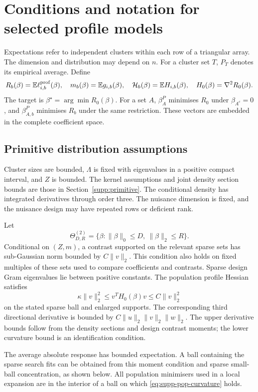\section{Conditions and notation for selected profile models}\label{supp:conditions}

Expectations refer to independent clusters within each row of a
triangular array. The dimension and distribution may depend on $n$.
For a cluster set $T$, $P_T$ denotes its empirical average. Define
\[
 R_b(\beta)=\mathbb{E}\ell_{i,b}^{\mathrm{prof}}(\beta),\quad
 m_b(\beta)=\mathbb{E} g_{i,b}(\beta),\quad
 \mathcal H_b(\beta)=\mathbb{E} H_{i,b}(\beta),\quad
 H_0(\beta)=\nabla^2R_0(\beta).
\]
The target is $\beta^\star=\arg\min R_0(\beta)$. For a set $A$,
$\beta_A^P$ minimises $R_0$ under $\beta_{A^c}=0$, and
$\beta_{A,b}^P$ minimises $R_b$ under the same restriction. These
vectors are embedded in the complete coefficient space.

\subsection{Primitive distribution assumptions}

Cluster sizes are bounded, $\Lambda$ is fixed with eigenvalues in a
positive compact interval, and $Z$ is bounded. The kernel assumptions
and joint density section bounds are those in
Section~\ref{supp:primitive}. The conditional density has integrated
derivatives through order three. The nuisance dimension is fixed, and
the nuisance design may have repeated rows or deficient rank.

Let
\[
 \Theta_{D,R}^{(2)}=\{\beta:\|\beta\|_0\leq D,\ \|\beta\|_2\leq R\}.
\]
Conditional on $(Z,m)$, a contrast supported on the relevant sparse
sets has sub-Gaussian norm bounded by $C\|v\|_2$. This condition also
holds on fixed multiples of these sets used to compare coefficients
and contrasts. Sparse design Gram eigenvalues lie between positive
constants. The population profile Hessian satisfies
\begin{equation}\label{eq:supp-pop-curvature}
 \kappa\|v\|_2^2\leq v^TH_0(\beta)v\leq C\|v\|_2^2
\end{equation}
on the stated sparse ball and enlarged supports. The corresponding
third directional derivative is bounded by
$C\|u\|_2\|v\|_2\|w\|_2$. The upper derivative bounds follow from
the density sections and design contrast moments; the lower curvature
bound is an identification condition.

The average absolute response has bounded expectation. A ball
containing the sparse search fits can be obtained from this moment
condition and sparse small-ball concentration, as shown below.
All population minimisers used in a local expansion are in the
interior of a ball on which \eqref{eq:supp-pop-curvature} holds.

